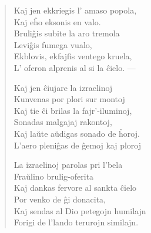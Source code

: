 \begin{verse}
                  Kaj jen ekkriegis l' amaso popola,\\
                   \vin     Kaj e\^ho eksonis en valo.\\
                  Bruli\^gis subite la aro tremola\\
                   \vin     Levi\^gis fumega vualo,\\
                  Ekblovis, ekfajfis ventego kruela,\\
                  L' oferon alprenis al si la \^cielo. ---

                  Kaj jen \^ciujare la izraelinoj\\
                   \vin     Kunvenas por plori sur montoj\\
                  Kaj tie \^ci brilas la fajr'-iluminoj,\\
                   \vin     Sonadas malgajaj rakontoj,\\
                  Kaj la\u ute a\u udigas sonado de \^horoj.\\
                  L'aero pleni\^gas de \^gemoj kaj ploroj

                  La izraelinoj parolas pri l'bela\\
                   \vin     Fra\u ulino brulig-oferita\\
                  Kaj dankas fervore al sankta \^cielo\\
                    \vin    Por venko de \^gi donacita,\\
                  Kaj sendas al Dio petegojn humilajn\\
                  Forigi de l'lando terurojn similajn.

\end{verse}

\smallrule{}

